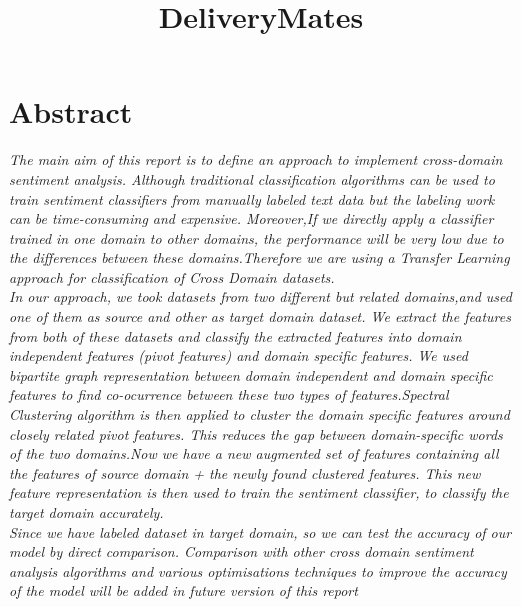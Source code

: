 \documentclass{report}
\begin{document}
\title{\Huge  DeliveryMates\linebreak}
\date{}
\maketitle
\setlength{\columnsep}{0.7cm}
\chapter{Abstract}
\par \Large \textit {The main aim of this report is to define an approach to implement cross-domain sentiment analysis. Although traditional classification algorithms can be used to train sentiment classifiers from manually labeled text data but the labeling work can be time-consuming and expensive. Moreover,If we directly apply a classifier trained in one domain to other domains, the performance will be very low due to the differences between these domains.Therefore we are using a Transfer Learning approach for classification of Cross Domain datasets.\\
\linebreak
In our approach, we took datasets from two different but related domains,and used one of them  as source and other as target domain dataset. We extract the features from both of these datasets and classify the extracted features into domain independent features (pivot features) and domain specific features. We used bipartite graph representation between domain independent and domain specific features to find co-ocurrence  between these two types of features.Spectral Clustering algorithm is then applied to cluster the domain specific features around closely related pivot features. This reduces the gap between domain-specific words of the two domains.Now we have a new augmented set of features containing all the features of source domain + the newly found clustered features. This new feature representation is then used to train the sentiment classifier, to classify the target domain accurately.\\
\linebreak
Since we have labeled dataset in target domain, so we can test the accuracy of our model by direct comparison. Comparison with other cross domain sentiment analysis algorithms and various optimisations techniques to improve the accuracy of the model will be added in future version of this report
}
\end{document}
